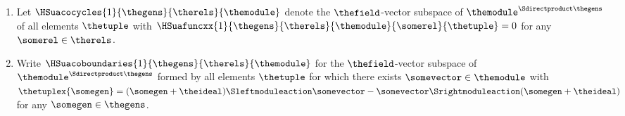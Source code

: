 \documentclass[pdftex]{sigma}
\numberwithin{equation}{section}
\begin{document}
{{  \begin{Definition}\quad
    \begin{enumerate}
  \item Let $\HSuacocycles{1}{\thegens}{\therels}{\themodule}$ denote the $\thefield$-vector subspace of $\themodule^{\Sdirectproduct \thegens}$ of all elements $\thetuple$ with $\HSuafuncxx{1}{\thegens}{\therels}{\themodule}{\somerel}{\thetuple}=0$ for any $\somerel\in\therels$.
    \item Write $\HSuacoboundaries{1}{\thegens}{\therels}{\themodule}$ for the $\thefield$-vector subspace of $\themodule^{\Sdirectproduct \thegens}$ formed by all elements $\thetuple$ for which there exists $\somevector\in\themodule$ with $\thetuplex{\somegen}=(\somegen+\theideal)\Sleftmoduleaction\somevector-\somevector\Srightmoduleaction(\somegen+\theideal)$ for any $\somegen\in\thegens$.
    \end{enumerate}
  \end{Definition}
}

}
\end{document}
